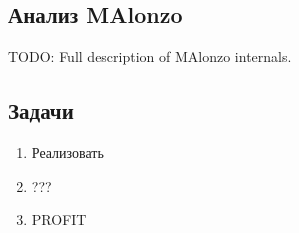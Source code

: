 \subsection{Анализ MAlonzo}

TODO: Full description of MAlonzo internals.

\subsection{Задачи}

\begin{enumerate}
\item Реализовать
\item ???
\item PROFIT
\end{enumerate}
